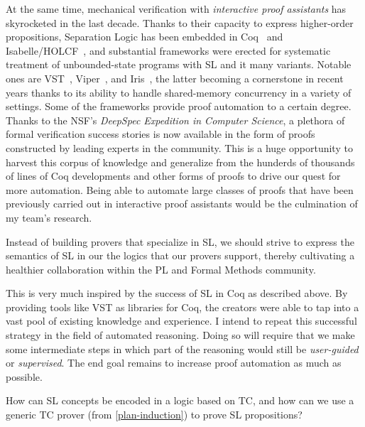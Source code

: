At the same time, mechanical verification with \emph{interactive proof assistants} has skyrocketed in the last decade.
Thanks to their capacity to express higher-order propositions, Separation Logic has been embedded in Coq~\cite{PLDI2015:Sergey} and Isabelle/HOLCF~\cite{MFPS2008:Varming},
and substantial frameworks were erected for systematic treatment of unbounded-state programs with SL and it many variants.
Notable ones are VST~\cite{JAR2018:Cao}, Viper~\cite{VMCAI2016:Muller}, and Iris~\cite{POPL2015:Jung,ICFP2016:Jung,ESOP2017:Krebbers}, the latter becoming a cornerstone in recent years thanks to its ability to handle shared-memory concurrency in a variety of settings.
Some of the frameworks provide proof automation to a certain degree.
Thanks to the NSF's \emph{DeepSpec Expedition in Computer Science}, a plethora of formal verification success stories is now available in the form of proofs constructed by leading experts in the community.
This is a huge opportunity to harvest this corpus of knowledge and generalize from the hunderds of thousands of lines of Coq developments and other forms of proofs to drive our quest for more automation.
Being able to automate large classes of proofs that have been previously carried out in interactive proof assistants would be the culmination of my team's research.

\begin{proposal}
Instead of building provers that specialize in SL, we should strive to express the semantics of SL in our the logics that our provers support, thereby cultivating a healthier collaboration within the PL and Formal Methods community.
\end{proposal}

This is very much inspired by the success of SL in Coq as described above.
By providing tools like VST as libraries for Coq, the creators were able to tap into a vast pool of existing knowledge and experience.
I intend to repeat this successful strategy in the field of automated reasoning.
Doing so will require that we make some intermediate steps in which part of the reasoning would still be
\emph{user-guided} or \emph{supervised}.
The end goal remains to increase proof automation as much as possible.

\begin{researchquestion}
How can SL concepts be encoded in a logic based on TC,
and how can we use a generic TC prover (from \autoref{plan-induction})
to prove SL propositions?
\end{researchquestion}


